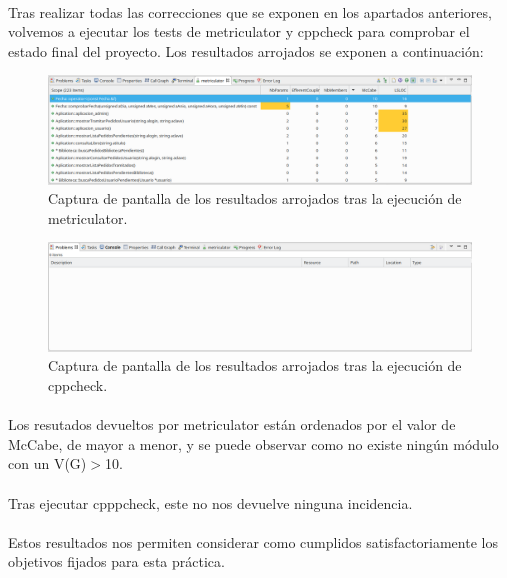 	\paragraph{}Tras realizar todas las correcciones que se exponen en los apartados anteriores, volvemos a ejecutar los tests de metriculator y cppcheck para comprobar el estado final del proyecto. Los resultados arrojados se exponen a continuación:
	
	\begin{figure}[H]
		\centering
		\includegraphics[scale=0.32]{img/captura111.png}
		\caption{Captura de pantalla de los resultados arrojados tras la ejecución de metriculator.}
		\label{captura111}
	\end{figure}

	\begin{figure}[H]
		\centering
		\includegraphics[scale=0.32]{img/captura112.png}
		\caption{Captura de pantalla de los resultados arrojados tras la ejecución de cppcheck.}
		\label{captura112}
	\end{figure}

	\paragraph{}Los resutados devueltos por metriculator están ordenados por el valor de McCabe, de mayor a menor, y se puede observar como no existe ningún módulo con un V(G)$>$10.
	
	\paragraph{}Tras ejecutar cpppcheck, este no nos devuelve ninguna incidencia.
	
	\paragraph{}Estos resultados nos permiten considerar como cumplidos satisfactoriamente los objetivos fijados para esta práctica.
	
\newpage